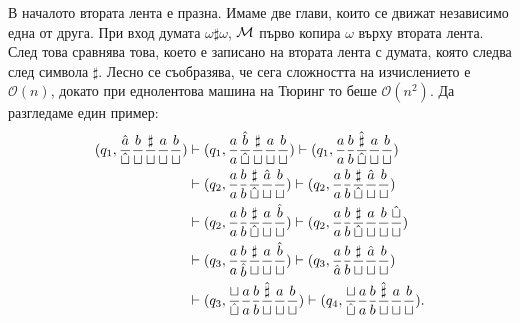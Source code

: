\begin{example}
В началото втората лента е празна. Имаме две глави, които се движат независимо една от друга.
При вход думата $\omega\sharp\omega$, $\mathcal{M}$ първо копира $\omega$ върху втората лента.
След това сравнява това, което е записано на втората лента с думата, която следва след символа $\sharp$.
Лесно се съобразява, че сега сложността на изчислението е $\mathcal{O}(n)$,
докато при еднолентова машина на Тюринг то беше $\mathcal{O}(n^2)$.
Да разгледаме един пример:
\begin{align*}
  (q_1, \frac{\hat{a}}{\hat{\sqcup}}\frac{b}{\sqcup}\frac{\sharp}{\sqcup}\frac{a}{\sqcup}\frac{b}{\sqcup}) & \vdash (q_1, \frac{a}{a}\frac{\hat{b}}{\hat{\sqcup}}\frac{\sharp}{\sqcup}\frac{a}{\sqcup}\frac{b}{\sqcup}) \vdash (q_1, \frac{a}{a}\frac{b}{b}\frac{\hat{\sharp}}{\hat{\sqcup}}\frac{a}{\sqcup}\frac{b}{\sqcup}) \\
                                                                                                           & \vdash (q_2, \frac{a}{a}\frac{b}{b}\frac{\sharp}{\hat{\sqcup}}\frac{\hat{a}}{\sqcup}\frac{b}{\sqcup}) \vdash (q_2, \frac{a}{a}\frac{b}{b}\frac{\sharp}{\hat{\sqcup}}\frac{\hat{a}}{\sqcup}\frac{b}{\sqcup})\\
                                                                                                           & \vdash (q_2, \frac{a}{a}\frac{b}{b}\frac{\sharp}{\hat{\sqcup}}\frac{a}{\sqcup}\frac{\hat{b}}{\sqcup}) \vdash (q_2, \frac{a}{a}\frac{b}{b}\frac{\sharp}{\hat{\sqcup}}\frac{a}{\sqcup}\frac{b}{\sqcup}\frac{\hat{\sqcup}}{\sqcup})\\
                                                                                                           & \vdash (q_3, \frac{a}{a}\frac{b}{\hat{b}}\frac{\sharp}{\sqcup}\frac{a}{\sqcup}\frac{\hat{b}}{\sqcup}) \vdash (q_3, \frac{a}{\hat{a}}\frac{b}{b}\frac{\sharp}{\sqcup}\frac{\hat{a}}{\sqcup}\frac{b}{\sqcup}) \\
                                                                                                           & \vdash (q_3, \frac{\sqcup}{\hat{\sqcup}}\frac{a}{a}\frac{b}{b}\frac{\hat{\sharp}}{\sqcup}\frac{a}{\sqcup}\frac{b}{\sqcup}) \vdash (q_4, \frac{\sqcup}{\hat{\sqcup}}\frac{a}{a}\frac{b}{b}\frac{\hat{\sharp}}{\sqcup}\frac{a}{\sqcup}\frac{b}{\sqcup}).
\end{align*}
\end{example}

